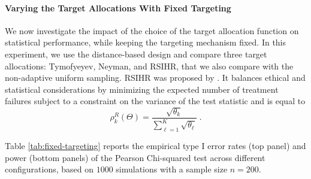 \paragraph*{Varying the Target Allocations With Fixed Targeting}

We now investigate the impact of the choice of the target allocation function on statistical performance, while keeping the targeting mechanism fixed. In this experiment, we use the distance-based design and compare three target allocations: Tymofyeyev, Neyman, and RSIHR, that we also compare with the non-adaptive uniform sampling. RSIHR was proposed by
\cite{Rosenberger01Opt}. It balances ethical and statistical considerations by
minimizing the expected number of treatment failures subject to a constraint
on the variance of the test statistic and is equal to
\[\rho_k^R(\Theta) = \frac{\sqrt{\theta_k}}{\sum_{\ell=1}^{K}\sqrt{\theta_{\ell}}}\;.\]

Table \ref{tab:fixed-targeting} reports the empirical type I error rates (top panel) and power (bottom panels) of the Pearson Chi-squared test across different configurations, based on $1000$ simulations with a sample size $n=200$.

%

